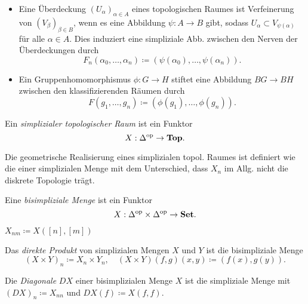 \documentclass{cheat-sheet}
\begin{document}
\begin{bspe}
  \begin{itemize}
    \item Eine Überdeckung $(U_\alpha)_{\alpha \in A}$ eines topologischen Raumes ist Verfeinerung von $(V_\beta)_{\beta \in B}$, wenn es eine Abbildung $\psi : A \to B$ gibt, sodass $U_\alpha \subset V_{\psi(\alpha)}$ für alle $\alpha \in A$. Dies induziert eine simpliziale Abb. zwischen den Nerven der Überdeckungen durch
    \[ F_n(\alpha_0, \ldots, \alpha_n) \coloneqq (\psi(\alpha_0), \ldots, \psi(\alpha_n)). \]
    \item Ein Gruppenhomomorphismus $\phi : G \to H$ stiftet eine Abbildung $BG \to BH$ zwischen den klassifizierenden Räumen durch
    \[ F(g_1, \ldots, g_n) \coloneqq (\phi(g_1), \ldots, \phi(g_n)). \]
  \end{itemize}
\end{bspe}


\begin{defn}
  Ein \emph{simplizialer topologischer Raum} ist ein Funktor
  \[ X : \Delta^{\mathrm{op}} \to \mathbf{Top}. \]
\end{defn}

\begin{bem}
  Die geometrische Realisierung eines simplizialen topol. Raumes ist definiert wie die einer simplizialen Menge mit dem Unterschied, dass $X_n$ im Allg. nicht die diskrete Topologie trägt.
\end{bem}

\begin{defn}
  Eine \emph{bisimpliziale Menge} ist ein Funktor
  \[ X : \Delta^{\mathrm{op}} \times \Delta^{\mathrm{op}} \to \mathbf{Set}. \]
\end{defn}

\begin{nota}
  $X_{nm} \coloneqq X([n],[m])$
\end{nota}

\begin{bsp}
  Das \emph{direkte Produkt} von simplizialen Mengen $X$ und $Y$ ist die bisimpliziale Menge
  \[
    (X \times Y)_n \coloneqq X_n \times Y_n, \quad
    (X \times Y)(f, g)(x, y) \coloneqq (f(x), g(y)).
  \]
\end{bsp}

\begin{defn}
  Die \emph{Diagonale} $DX$ einer bisimplizialen Menge $X$ ist die simpliziale Menge mit
  $(DX)_n \coloneqq X_{nn}$ und $DX(f) \coloneqq X(f, f)$.
\end{defn}
\end{document}
